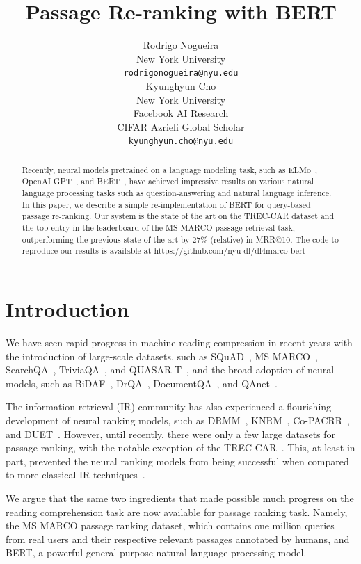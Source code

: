 \documentclass{article} %
\title{Passage Re-ranking with BERT}
\author{Rodrigo Nogueira\\
New York University\\
\texttt{rodrigonogueira@nyu.edu} \\
\And
Kyunghyun Cho \\
New York University\\
Facebook AI Research\\
CIFAR Azrieli Global Scholar\\
\texttt{kyunghyun.cho@nyu.edu} \\
}
\begin{document}
\maketitle
\begin{abstract}
Recently, neural models pretrained on a language modeling task, such as ELMo~\citep{peters2017semi}, OpenAI GPT~\citep{radford2018improving}, and BERT~\citep{devlin2018bert}, have achieved impressive results on various natural language processing tasks such as question-answering and natural language inference. In this paper, we describe a simple re-implementation of BERT for query-based passage re-ranking. Our system is the state of the art on the TREC-CAR dataset and the top entry in the leaderboard of the MS MARCO passage retrieval task, outperforming the previous state of the art by 27\% (relative) in MRR@10. The code to reproduce our results is available at \url{https://github.com/nyu-dl/dl4marco-bert}
\end{abstract}

\section{Introduction}

We have seen rapid progress in machine reading compression in recent years with the introduction of large-scale datasets, such as SQuAD~\citep{rajpurkar2016squad}, MS MARCO~\citep{nguyen2016ms}, SearchQA~\citep{dunn2017searchqa}, TriviaQA~\citep{joshi2017triviaqa}, and QUASAR-T~\citep{dhingra2017quasar}, and the broad adoption of neural models, such as BiDAF~\citep{seo2016bidirectional}, DrQA~\citep{chen2017reading}, DocumentQA~\citep{clark2017simple}, and QAnet~\citep{yu2018qanet}.

The information retrieval (IR) community has also experienced a flourishing development of neural ranking models, such as DRMM~\citep{guo2016deep}, KNRM~\citep{xiong2017end}, Co-PACRR~\citep{hui2018co}, and DUET~\citep{mitra2017learning}. However, until recently, there were only a few large datasets for passage ranking, with the notable exception of the TREC-CAR~\citep{dietz2017trec}. This, at least in part, prevented the neural ranking models from being successful when compared to more classical IR techniques~\citep{lin2019neural}.

We argue that the same two ingredients that made possible much progress on the reading comprehension task are now available for passage ranking task. Namely, the MS MARCO passage ranking dataset, which contains one million queries from real users and their respective relevant passages annotated by humans, and BERT, a powerful general purpose natural language processing model.
\end{document}
